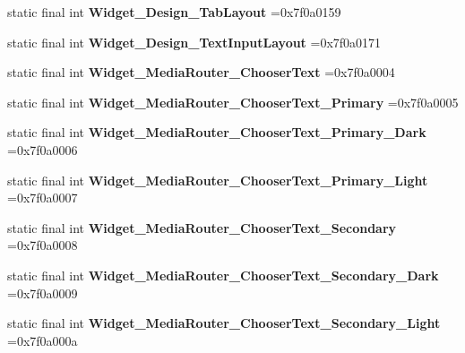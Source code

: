 \begin{DoxyCompactItemize}
static final int {\bfseries Widget\+\_\+\+Design\+\_\+\+Tab\+Layout} =0x7f0a0159
\item 
\mbox{\label{classproject4_1_1xaria_1_1R_1_1style_a6227e0cde7964f0de9af44822fb02001}} 
static final int {\bfseries Widget\+\_\+\+Design\+\_\+\+Text\+Input\+Layout} =0x7f0a0171
\item 
\mbox{\label{classproject4_1_1xaria_1_1R_1_1style_ad28f2e69bb31873544d5d0bf4ba7525c}} 
static final int {\bfseries Widget\+\_\+\+Media\+Router\+\_\+\+Chooser\+Text} =0x7f0a0004
\item 
\mbox{\label{classproject4_1_1xaria_1_1R_1_1style_a45da16f6cd89117aaeb30d99f5c76374}} 
static final int {\bfseries Widget\+\_\+\+Media\+Router\+\_\+\+Chooser\+Text\+\_\+\+Primary} =0x7f0a0005
\item 
\mbox{\label{classproject4_1_1xaria_1_1R_1_1style_a6ed202086ced17e8f6bc1a6e16ce4363}} 
static final int {\bfseries Widget\+\_\+\+Media\+Router\+\_\+\+Chooser\+Text\+\_\+\+Primary\+\_\+\+Dark} =0x7f0a0006
\item 
\mbox{\label{classproject4_1_1xaria_1_1R_1_1style_ad928a6dc5dbb3d37faa2a55d50501372}} 
static final int {\bfseries Widget\+\_\+\+Media\+Router\+\_\+\+Chooser\+Text\+\_\+\+Primary\+\_\+\+Light} =0x7f0a0007
\item 
\mbox{\label{classproject4_1_1xaria_1_1R_1_1style_ae3241d0597c9e2ddd377b5ac4ed71547}} 
static final int {\bfseries Widget\+\_\+\+Media\+Router\+\_\+\+Chooser\+Text\+\_\+\+Secondary} =0x7f0a0008
\item 
\mbox{\label{classproject4_1_1xaria_1_1R_1_1style_a6a8e31816408861b10f3857afe316a3d}} 
static final int {\bfseries Widget\+\_\+\+Media\+Router\+\_\+\+Chooser\+Text\+\_\+\+Secondary\+\_\+\+Dark} =0x7f0a0009
\item 
\mbox{\label{classproject4_1_1xaria_1_1R_1_1style_afe6a9689b2d082ce504fe4bc74cee825}} 
static final int {\bfseries Widget\+\_\+\+Media\+Router\+\_\+\+Chooser\+Text\+\_\+\+Secondary\+\_\+\+Light} =0x7f0a000a

\end{DoxyCompactItemize}
